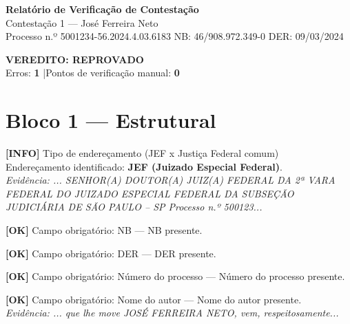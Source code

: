 \documentclass[12pt,a4paper]{article}
\newcommand{\statusOK}[1]{\textcolor{corOK}{\textbf{[OK]}} #1}
\newcommand{\statusINFO}[1]{\textcolor{corINFO}{\textbf{[INFO]}} #1}
\begin{document}
\begin{center}
  {\LARGE \textbf{Relatório de Verificação de Contestação}}\\[0.4em]
  {\large Contestação 1 --- José Ferreira Neto}\\[0.2em]
  {\small Processo n.º 5001234-56.2024.4.03.6183 \quad NB: 46/908.972.349-0 \quad DER: 09/03/2024}
\end{center}

\vspace{0.5em}
\noindent\colorbox{corFundoReprovado}{%
  \begin{minipage}{\dimexpr\linewidth-2\fboxsep}
    \centering
    \vspace{0.3em}
    {\large \textcolor{corERRO}{\textbf{VEREDITO: REPROVADO}}}\\
    Erros: \textbf{1} \quad|\quad Pontos de verificação manual: \textbf{0}
    \vspace{0.3em}
  \end{minipage}%
}

\vspace{1em}

\section{Bloco 1 --- Estrutural}

\statusINFO{Tipo de endereçamento (JEF x Justiça Federal comum)}\\
Endereçamento identificado: \textbf{JEF (Juizado Especial Federal)}.\\
\textit{Evidência: ... SENHOR(A) DOUTOR(A) JUIZ(A) FEDERAL DA 2ª VARA FEDERAL DO JUIZADO ESPECIAL FEDERAL DA SUBSEÇÃO JUDICIÁRIA DE SÃO PAULO -- SP Processo n.º 500123...}

\medskip
\statusOK{Campo obrigatório: NB} --- NB presente.

\medskip
\statusOK{Campo obrigatório: DER} --- DER presente.

\medskip
\statusOK{Campo obrigatório: Número do processo} --- Número do processo presente.

\medskip
\statusOK{Campo obrigatório: Nome do autor} --- Nome do autor presente.\\
\textit{Evidência: ... que lhe move JOSÉ FERREIRA NETO, vem, respeitosamente...}
\end{document}
